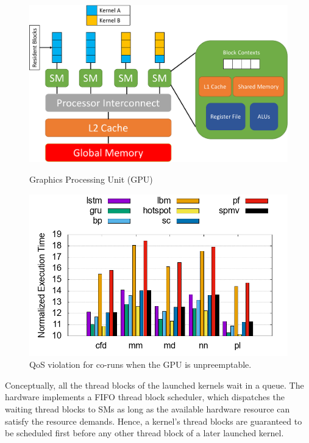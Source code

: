 	\begin{figure}
\vspace{-.25in}
		\centering
		\begin{minipage}{0.45\linewidth}
		\includegraphics[width=\linewidth]{figures/gpu_diagram_cropped.pdf}
		\caption{Graphics Processing Unit (GPU)}
		\label{fig:gpu}
		\end{minipage}
		\hfill
		\begin{minipage}{0.45\linewidth}
		\includegraphics[width=\linewidth]{figures/seq_time.png}
		\caption{QoS violation for co-runs when the GPU is unpreemptable.}
		\label{fig:qos}
		\end{minipage}
		\vspace{-0.6cm}
	\end{figure}

Conceptually, all the thread blocks of the launched kernels wait in a queue.  The hardware implements a FIFO thread block scheduler, which dispatches the waiting thread blocks to SMs as long as the available hardware resource can satisfy the resource demands. Hence, a kernel's thread blocks are guaranteed to be scheduled first before any other thread block of a later launched kernel.

